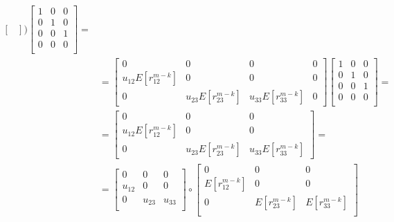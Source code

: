 \documentclass[\main/main.tex]{subfiles}
\begin{document}
\begin{equation}
\begin{split}
\begin{bmatrix}
    \end{bmatrix} 
     \Bigg)
       \begin{bmatrix}
    1 & 0 & 0\\
    0 & 1& 0\\
    0 & 0 & 1\\
    0 & 0 & 0\\
    \end{bmatrix} =\\
    &=
    \begin{bmatrix}
    0 & 0 & 0 & 0\\
    u_{12}E[r^{m-k}_{12}] & 0 & 0 & 0\\
    0 & u_{23}E[r^{m-k}_{23}] & u_{33}E[r^{m-k}_{33}] & 0
    \end{bmatrix}
    \begin{bmatrix}
    1 & 0 & 0\\
    0 & 1& 0\\
    0 & 0 & 1\\
    0 & 0 & 0\\
    \end{bmatrix} =\\
    &=
    \begin{bmatrix}
    0 & 0 &0\\
    u_{12}E[r^{m-k}_{12}] & 0 & 0\\
    0 & u_{23}E[r^{m-k}_{23}] & u_{33}E[r^{m-k}_{33}]
    \end{bmatrix} =\\
    &=
    \begin{bmatrix}
     0 & 0 &0\\
    u_{12} & 0 & 0\\
    0 & u_{23}& u_{33}\\
    \end{bmatrix}
    \circ
    \begin{bmatrix}
    0 & 0 &0\\
   E[r^{m-k}_{12}] & 0 & 0\\
    0 & E[r^{m-k}_{23}] & E[r^{m-k}_{33}]\\
    \end{bmatrix}
     \end{split}
 \end{equation}
\end{document}

